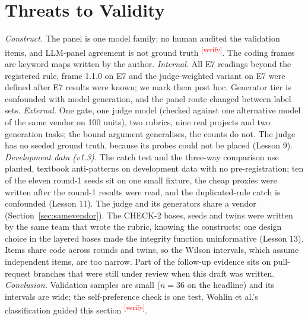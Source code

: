 \documentclass[10pt,a4paper]{article}
\newcommand{\citeneeded}[1]{\cite{#1}\textsuperscript{\textcolor{red}{\tiny[verify]}}}
\begin{document}
\section{Threats to Validity}\label{sec:threats}

\emph{Construct.} The panel is one model family; no human audited the validation items, and LLM-panel agreement is
not ground truth \citeneeded{ahmed2025annotation}. The coding frames are keyword maps written by the author.
\emph{Internal.} All E7 readings beyond the registered rule, frame 1.1.0 on E7 and the judge-weighted variant on E7
were defined after E7 results were known; we mark them post hoc. Generator tier is confounded with model
generation, and the panel route changed between label sets.
\emph{External.} One gate, one judge model (checked against one alternative model of the same vendor on 100
units), two rubrics, nine real projects and two generation tasks; the bound argument generalises, the counts do
not. The judge has no seeded ground truth, because its probes could not be placed (Lesson 9).
\emph{Development data (v1.3).} The catch test and the three-way comparison use planted, textbook anti-patterns on
development data with no pre-registration; ten of the eleven round-1 seeds sit on one small fixture, the cheap
proxies were written after the round-1 results were read, and the duplicated-rule catch is confounded
(Lesson 11). The judge and its generators share a vendor (Section~\ref{sec:samevendor}). The CHECK-2 bases, seeds
and twins were written by the same team that wrote the rubric, knowing the constructs; one design choice in the
layered bases made the integrity function uninformative (Lesson 13). Items share code across rounds and twins, so
the Wilson intervals, which assume independent items, are too narrow. Part of the follow-up evidence sits on
pull-request branches that were still under review when this draft was written.
\emph{Conclusion.} Validation samples are small ($n = 36$ on the headline) and its intervals are wide; the
self-preference check is one test.
Wohlin et al.'s classification guided this section \citeneeded{wohlin2012experimentation}.
\end{document}

